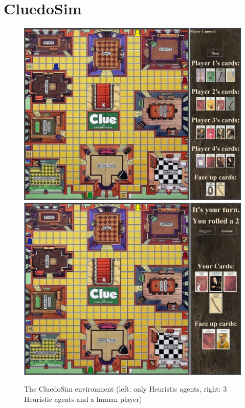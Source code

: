 \documentclass[msc, ai, twoside, notimes, logo, parskip, leftchapter, normalheadings]{infthesis}
\begin{document}
\section{CluedoSim}
\begin{figure}[h]
\caption{The CluedoSim environment (left: only Heuristic agents, right: 3 Heuristic agents and a human player)}
\centering
\includegraphics[scale=.3]{figures/cluedoSim}
\includegraphics[scale=.3]{figures/humanCluedoSim}
\end{figure}
\end{document}
